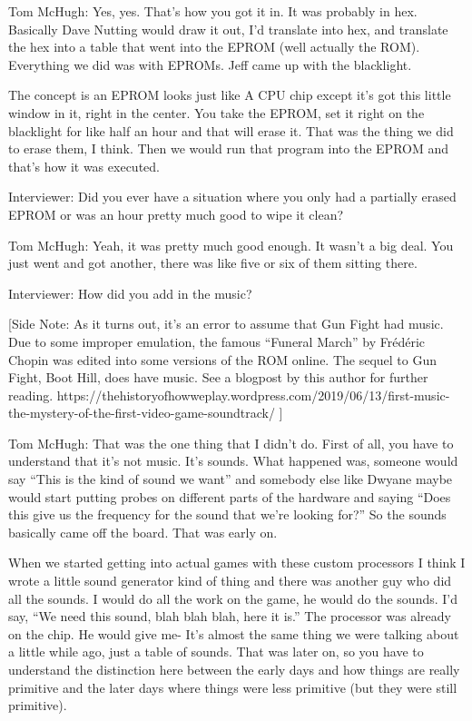 \textcolor{interviewee}{Tom McHugh:} Yes, yes. That’s how you got it in. It was probably in hex. Basically Dave Nutting would draw it out, I’d translate into hex, and translate the hex into a table that went into the EPROM (well actually the ROM). Everything we did was with EPROMs. Jeff came up with the blacklight. 

The concept is an EPROM looks just like A CPU chip except it’s got this little window in it, right in the center. You take the EPROM, set it right on the blacklight for like half an hour and that will erase it. That was the thing we did to erase them, I think. Then we would run that program into the EPROM and that’s how it was executed.

\textcolor{interviewer}{Interviewer:} Did you ever have a situation where you only had a partially erased EPROM or was an hour pretty much good to wipe it clean?

\textcolor{interviewee}{Tom McHugh:} Yeah, it was pretty much good enough. It wasn’t a big deal. You just went and got another, there was like five or six of them sitting there.

\textcolor{interviewer}{Interviewer:} How did you add in the music?

[Side Note: As it turns out, it’s an error to assume that Gun Fight had music. Due to some improper emulation, the famous “Funeral March” by Frédéric Chopin was edited into some versions of the ROM online. The sequel to Gun Fight, Boot Hill, does have music. See a blogpost by this author for further reading. https://thehistoryofhowweplay.wordpress.com/2019/06/13/first-music-the-mystery-of-the-first-video-game-soundtrack/  ]

\textcolor{interviewee}{Tom McHugh:} That was the one thing that I didn’t do. First of all, you have to understand that it’s not music. It’s sounds. What happened was, someone would say “This is the kind of sound we want” and somebody else like Dwyane maybe would start putting probes on different parts of the hardware and saying “Does this give us the frequency for the sound that we’re looking for?” So the sounds basically came off the board. That was early on.

When we started getting into actual games with these custom processors I think I wrote a little sound generator kind of thing and there was another guy who did all the sounds. I would do all the work on the game, he would do the sounds. I’d say, “We need this sound, blah blah blah, here it is.” The processor was already on the chip. He would give me- It’s almost the same thing we were talking about a little while ago, just a table of sounds. That was later on, so you have to understand the distinction here between the early days and how things are really primitive and the later days where things were less primitive (but they were still primitive).

